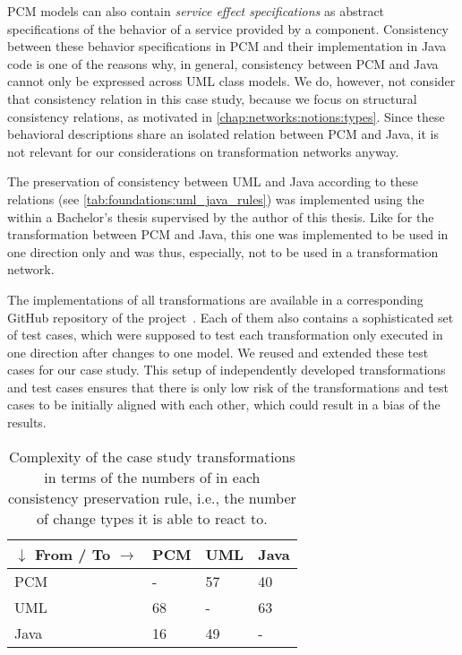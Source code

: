 \gls{PCM} models can also contain \emph{service effect specifications} as abstract specifications of the behavior of a service provided by a component.
Consistency between these behavior specifications in \gls{PCM} and their implementation in Java code is one of the reasons why, in general, consistency between \gls{PCM} and Java cannot only be expressed across \gls{UML} class models.
We do, however, not consider that consistency relation in this case study, because we focus on structural consistency relations, as motivated in \autoref{chap:networks:notions:types}.
Since these behavioral descriptions share an isolated relation between \gls{PCM} and Java, it is not relevant for our considerations on transformation networks anyway.

The preservation of consistency between \gls{UML} and Java according to these relations (see \autoref{tab:foundations:uml_java_rules}) was implemented using the \reactionslanguage within a Bachelor's thesis supervised by the author of this thesis.
Like for the transformation between \gls{PCM} and Java, this one was implemented to be used in one direction only and was thus, especially, not to be used in a transformation network.

The implementations of all transformations are available in a corresponding GitHub repository of the \vitruv project~\cite{vitruvCBSEGithub}.
Each of them also contains a sophisticated set of test cases, which were supposed to test each transformation only executed in one direction after changes to one model.
We reused and extended these test cases for our case study.
This setup of independently developed transformations and test cases ensures that there is only low risk of the transformations and test cases to be initially aligned with each other, which could result in a bias of the results.

\begin{table}
    \centering
    \small
    \renewcommand{\arraystretch}{1.4}
    \begin{tabular}{L{7em}C{4em}C{4em}C{4em}}
        \toprule
        \textbf{$\downarrow$ From} / \textbf{To $\rightarrow$}& \gls{PCM} & \gls{UML} & Java \\
        \midrule
        \gls{PCM} & -   & 57    & 40 \\
        \gls{UML} & 68  & -     & 63 \\
        Java      & 16  & 49    & -  \\
        \bottomrule
    \end{tabular}
    \caption[Complexity of case study transformations]{Complexity of the case study transformations in terms of the numbers of \reactions in each consistency preservation rule, i.e., the number of change types it is able to react to.}
    \label{tab:correctness_evaluation:errors:study_complexity}
\end{table}

